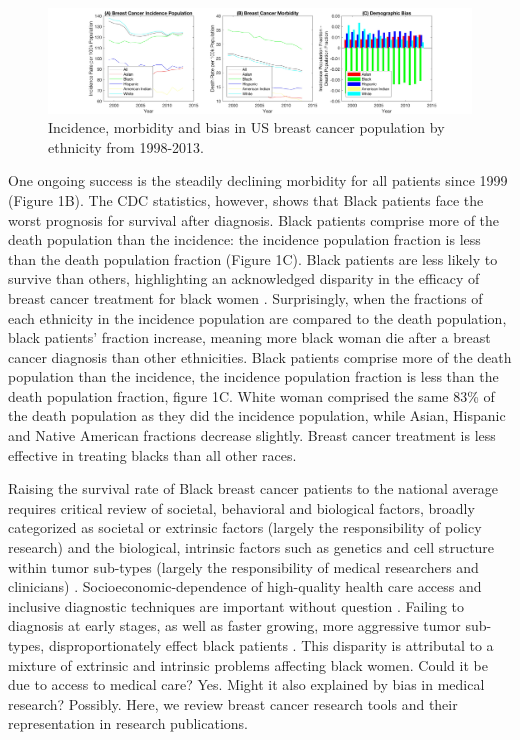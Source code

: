 \documentclass[11pt]{article}
\begin{document}
\begin{figure}[h!]
  \centering
  \includegraphics[width=1\columnwidth, trim = {20cm 0cm 10cm 0cm}, clip]{Figures/Rationale.jpg}
  \caption{\label{PS1} Incidence, morbidity and bias in US breast cancer population by ethnicity from 1998-2013. }%
\end{figure}

One ongoing success is the steadily declining morbidity for all patients since 1999 (Figure 1B). The CDC statistics, however, shows that Black patients face the worst prognosis for survival after diagnosis. Black patients comprise more of the death population than the incidence: the incidence population fraction is less than the death population fraction (Figure 1C). Black patients are less likely to survive than others, highlighting an acknowledged disparity in the efficacy of breast cancer treatment for black women \cite{greenlee2000cancer, berkman2014racial}. Surprisingly, when the fractions of each ethnicity in the incidence population are compared to the death population, black patients' fraction increase, meaning more black woman die after a breast cancer diagnosis than other ethnicities. Black patients comprise more of the death population than the incidence, the incidence population fraction is less than the death population fraction, figure 1C. White woman comprised the same 83\% of the death population as they did the incidence population, while Asian, Hispanic and Native American fractions decrease slightly. Breast cancer treatment is less effective in treating blacks than all other races. 

Raising the survival rate of Black breast cancer patients to the national average requires critical review of societal, behavioral and biological factors, broadly categorized as societal or extrinsic factors (largely the responsibility of policy research) and the biological, intrinsic factors such as genetics and cell structure within tumor sub-types (largely the responsibility of medical researchers and clinicians) \cite{reding2012examination, brennan2012there}. Socioeconomic-dependence of high-quality health care access and inclusive diagnostic techniques are important without question \cite{shavers2003racial}. Failing to diagnosis at early stages, as well as faster growing, more aggressive tumor sub-types, disproportionately effect black patients \cite{batina2013variation}. This disparity is attributal to a mixture of extrinsic and intrinsic problems affecting black women. Could it be due to access to medical care? Yes. Might it also explained by bias in medical research? Possibly. Here, we review breast cancer research tools and their representation in research publications.
\end{document}
